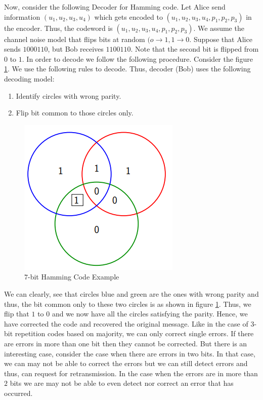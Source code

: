 \documentclass[12pt, oneside]{book}
\theoremstyle{definition}
\theoremstyle{definition}
\theoremstyle{remark}
\begin{document}
Now, consider the following Decoder for Hamming code. Let Alice send information $(u_1,u_2,u_3,u_4)$ which gets encoded to $(u_1,u_2,u_3,u_4,p_1,p_2,p_3)$ in the encoder. Thus, the codeword is $(u_1,u_2,u_3,u_4,p_1,p_2,p_3)$. We assume the channel noise model that flips bits at random $(o\rightarrow 1 , 1\rightarrow 0$. Suppose that Alice sends $1000110$, but Bob receives $1100110$. Note that the second bit is flipped from $0$ to $1$. In order to decode we follow the following procedure. Consider the figure \ref{fig:7bithamcodeexa}. We use the following rules to decode. Thus, decoder (Bob) uses the following decoding model:
\begin{enumerate}
    \item Identify circles with wrong parity.
    \item Flip bit common to those circles only.
\end{enumerate}
\begin{figure}
    \centering
    \includegraphics[width=0.5\linewidth]{../images/7bithamcodeex.png}
    \caption{$7$-bit Hamming Code Example}
    \label{fig:7bithamcodeexa}
\end{figure}
We can clearly, see that circles blue and green are the ones with wrong parity and thus, the bit common only to these two circles is as shown in figure \ref{fig:7bithamcodeexa}. Thus, we flip that $1$ to $0$ and we now have all the circles satisfying the parity. Hence, we have corrected the code and recovered the original message. Like in the case of $3$-bit repetition codes based on majority, we can only correct single errors. If there are errors in more than one bit then they cannot be corrected. But there is an interesting case, consider the case when there are errors in two bits. In that case, we can may not be able to correct the errors but we can still detect errors and thus, can request for retransmission. In the case when the errors are in more than $2$ bits we are may not be able to even detect nor correct an error that has occurred.
\end{document}
